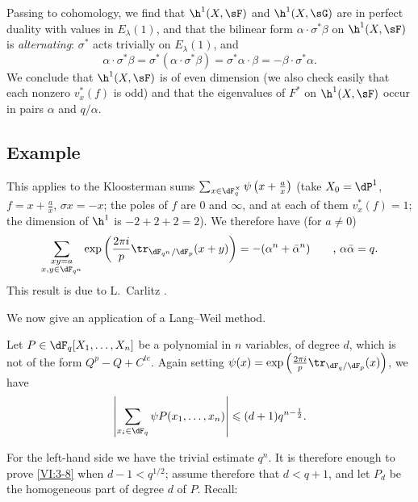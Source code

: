 \documentclass[oneside]{book}
\begin{document}
Passing to cohomology, we find that $\h^1(X,\sF)$ and $\h^1(X,\sG)$ are in 
perfect duality with values in $E_\lambda(1)$, and that the bilinear form 
$\alpha\cdot \sigma^\ast\beta$ on $\h^1(X,\sF)$ is \emph{alternating}: 
$\sigma^\ast$ acts trivially on $E_\lambda(1)$, and 
\[
  \alpha\cdot \sigma^\ast \beta = \sigma^\ast(\alpha\cdot \sigma^\ast \beta) = \sigma^\ast \alpha\cdot \beta = -\beta\cdot \sigma^\ast \alpha \text{.} 
\]
We conclude that $\h^1(X,\sF)$ is of even dimension (we also check 
    easily that each nonzero $v_x^\ast(f)$ is odd) and that the 
eigenvalues of $F^\ast$ on $\h^1(X,\sF)$ occur in pairs $\alpha$ and 
$q/\alpha$. 





\subsection{Example}\label{VI:3-7}

This applies to the Kloosterman sums 
$\sum_{x\in \dF_q^\times} \psi\left(x+\frac a x\right)$ (take 
$X_0=\dP^1$, $f=x+\frac a x$, $\sigma x=-x$; the poles of $f$ are $0$ and 
$\infty$, and at each of them $v_x^\ast(f)=1$; the dimension of $\h^1$ is 
$-2+2+2=2$). We therefore have (for $a\ne 0$) 
\[
  \sum_{\substack{x y=a \\ x,y\in \dF_{q^n}}} \exp\left(\frac{2\pi i}{p} \tr_{\dF_{q^n}/\dF_p}(x+y)\right) = -(\alpha^n+\bar\alpha^n) \qquad \text{, }\alpha\bar \alpha = q \text{.} 
\]
This result is due to L.\ Carlitz \cite{ca69}. 

We now give an application of a Lang--Weil method. 





\begin{proposition_}\label{VI:3-8}
Let $P\in \dF_q[X_1,\dots,X_n]$ be a polynomial in $n$ variables, of degree 
$d$, which is not of the form $Q^p-Q+C^{te}$. Again setting 
$\psi(x) = \exp\left(\frac{2\pi i}{p} \tr_{\dF_q/\dF_p}(x)\right)$, we have 
\[
  \left|\sum_{x_i\in \dF_q} \psi P(x_1,\dots,x_n)\right| \leqslant (d+1) q^{n-\frac 1 2} \text{.}
\]
\end{proposition_}

For the left-hand side we have the trivial estimate $q^n$. It is therefore enough to 
prove \ref{VI:3-8} when $d-1<q^{1/2}$; assume therefore that 
$d<q+1$, and let $P_d$ be the homogeneous part of degree $d$ of $P$. Recall: 
\end{document}
